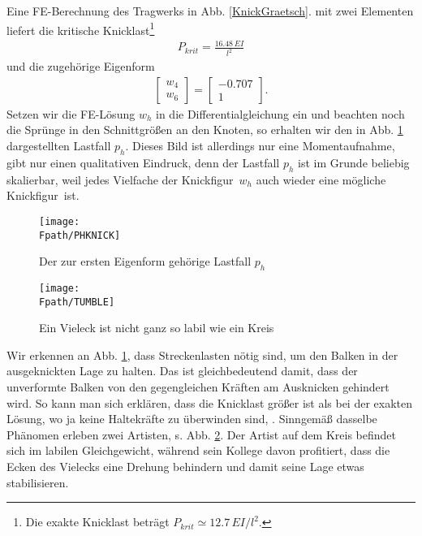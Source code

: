   Eine FE-Berechnung des Tragwerks in Abb. \ref{KnickGraetsch}.
mit zwei Elementen liefert die kritische Knicklast\footnote{Die exakte Knicklast betr\"{a}gt
$P_{krit}\simeq 12.7\,EI/l^2$.}
\begin{align}
P_{krit}=\frac{16.48\,EI}{l^2}
\end{align}
und die zugeh\"{o}rige Eigenform
\begin{eqnarray}
\left[ \begin{array}{r}
 w_4\\
 w_6
 \end{array}
  \right]= \left[ \begin{array}{c}
 -0.707\\
1
 \end{array}
  \right].
\end{eqnarray}
Setzen wir die FE-L\"{o}sung $w_h$ in die Differentialgleichung ein und beachten noch die
Spr\"{u}nge in den Schnittgr\"{o}{\ss}en an den Knoten, so erhalten wir den in Abb. \ref{phknick}
dargestellten Lastfall $p_h$. Dieses Bild ist allerdings nur eine Momentaufnahme, gibt
nur einen qualitativen Eindruck, denn der Lastfall $p_h$ ist im Grunde beliebig
skalierbar, weil jedes Vielfache der \glq Knickfigur\grq\ $w_h$ auch wieder eine
m\"{o}gliche \glq Knickfigur\grq\ ist.
\begin{figure}[tbp] \centering
\if {} \sidecaption \fi
\texttt{[image: \\Fpath/PHKNICK]}
\caption{Der zur ersten Eigenform geh\"{o}rige Lastfall $p_h$}\label{phknick}
\end{figure}%

\begin{figure}[tbp] \centering
\if {} \sidecaption \fi
\texttt{[image: \\Fpath/TUMBLE]}
\caption{Ein Vieleck ist nicht ganz so labil wie ein Kreis}\label{Tumble}
\end{figure}%

Wir erkennen an Abb. \ref{phknick}, dass Streckenlasten n\"{o}tig sind, um den Balken in der ausgeknickten Lage zu halten. Das ist gleichbedeutend damit, dass der unverformte Balken von den gegengleichen Kr\"{a}ften am Ausknicken gehindert wird. So kann man sich erkl\"{a}ren, dass die Knicklast gr\"{o}{\ss}er ist als bei der exakten L\"{o}sung, wo ja keine Haltekr\"{a}fte zu \"{u}berwinden sind, \cite{Petersen1}. Sinngem\"{a}{\ss} dasselbe Ph\"{a}nomen erleben zwei Artisten, s. Abb. \ref{Tumble}. Der Artist auf dem Kreis befindet sich im labilen Gleichgewicht, w\"{a}hrend sein Kollege davon profitiert, dass die Ecken des Vielecks eine Drehung behindern und damit seine Lage etwas stabilisieren.


